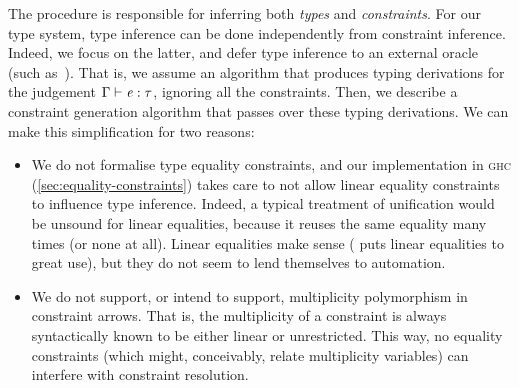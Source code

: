 \documentclass[acmsmall,usenames,dvipsnames,natbib=false,acmthm=false,screen]{acmart}
\theoremstyle{acmplain}
\theoremstyle{acmdefinition}
\begin{document}
The procedure is responsible for inferring both \emph{types} and \emph{constraints}.
For our type system, type inference can be done independently from constraint
inference. Indeed, we focus on the latter, and defer type inference to
an external oracle (such as~\cite{linear-types-inference}).
That is, we assume an algorithm that produces typing derivations for the
judgement $\Gamma  \vdash  \mathit{e}  :  \tau$, ignoring all the constraints. Then, we describe a
constraint generation algorithm that passes over these typing derivations.
%
%
We can make this simplification for two reasons:
\begin{itemize}
\item We do not formalise type equality constraints, and our implementation
  in \textsc{ghc} (\cref{sec:equality-constraints}) takes care to not allow linear equality constraints to influence type inference.
  Indeed, a typical treatment of unification
  would be unsound for linear equalities, because it reuses the same
  equality many times (or none at all). Linear equalities make sense
  (\citet{shulman2018linear} puts linear
  equalities to great use), but they do not seem to lend themselves to
  automation.
\item We do not support, or intend to support, multiplicity
  polymorphism in constraint arrows. That is, the multiplicity of a
  constraint is always syntactically known to be either linear or
  unrestricted. This way, no equality constraints (which might, conceivably,
  relate multiplicity variables) can interfere with
  constraint resolution.
\end{itemize}
%
\end{document}
